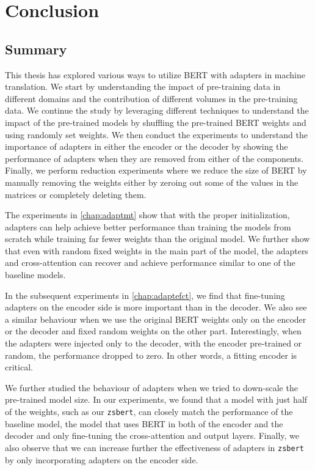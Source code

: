 \chapter*{Conclusion}

\section{Summary}
This thesis has explored various ways to utilize BERT with adapters in machine translation. We start by understanding the impact of pre-training data in different domains and the contribution of different volumes in the pre-training data. We continue the study by leveraging different techniques to understand the impact of the pre-trained models by shuffling the pre-trained BERT weights and using randomly set weights. We then conduct the experiments to understand the importance of adapters in either the encoder or the decoder by showing the performance of adapters when they are removed from either of the components. Finally, we perform reduction experiments where we reduce the size of BERT by manually removing the weights either by zeroing out some of the values in the matrices or completely deleting them.

The experiments in \cref{chap:adaptmt} show that with the proper initialization, adapt\-ers can help achieve better performance than training the models from scratch while training far fewer weights than the original model. We further show that even with random fixed weights in the main part of the model, the adapters and cross-attention can recover and achieve performance similar to one of the baseline models.

In the subsequent experiments in \cref{chap:adaptefct}, we find that fine-tuning adapters on the encoder side is more important than in the decoder. We also see a similar behaviour when we use the original BERT weights only on the encoder or the decoder and fixed random weights on the other part. Interestingly, when the adapters were injected only to the decoder, with the encoder pre-trained or random, the performance dropped to zero. In other words, a fitting encoder is critical.

We further studied the behaviour of adapters when we tried to down-scale the pre-trained model size. In our experiments, we found that a model with just half of the weights, such as our \texttt{zsbert}, can closely match the performance of the baseline model, the model that uses BERT in both of the encoder and the decoder and only fine-tuning the cross-attention and output layers. Finally, we also observe that we can increase further the effectiveness of adapters in \texttt{zsbert} by only incorporating adapters on the encoder side.

